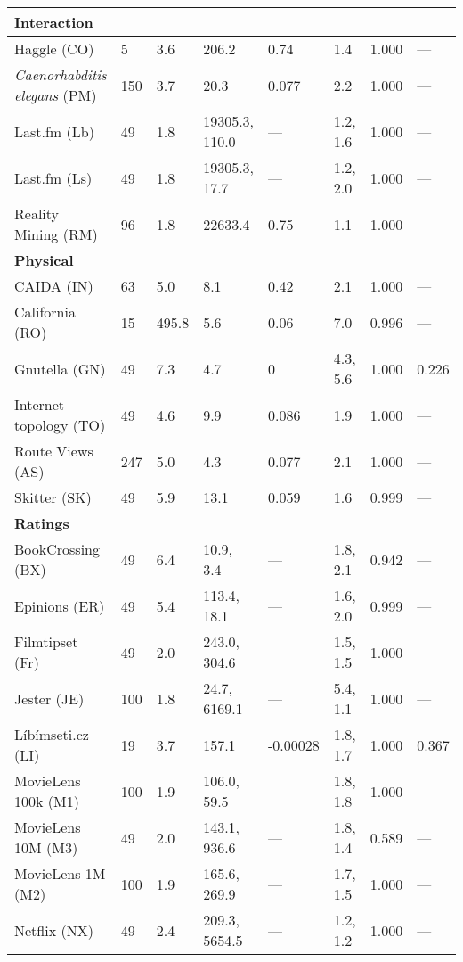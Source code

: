 \begin{longtable}{ llllllll }
\hline
\multicolumn{8}{|l|}{\textbf{Interaction}} \\
\hline
Haggle (\textsf{CO})              & 5 & 3.6 & 206.2 & 0.74 & 1.4 & 1.000 & --- \\
{\it{Caenorhabditis elegans}} (\textsf{PM}) & 150 & 3.7 & 20.3 & 0.077 & 2.2 & 1.000 & --- \\
Last.fm (\textsf{Lb})             & 49 & 1.8 & 19305.3, 110.0 & --- & 1.2, 1.6 & 1.000 & --- \\
Last.fm (\textsf{Ls})             & 49 & 1.8 & 19305.3, 17.7 & --- & 1.2, 2.0 & 1.000 & --- \\
Reality Mining (\textsf{RM})      & 96 & 1.8 & 22633.4 & 0.75 & 1.1 & 1.000 & --- \\

\hline
\multicolumn{8}{|l|}{\textbf{Physical}} \\
\hline
CAIDA (\textsf{IN})               & 63 & 5.0 & 8.1 & 0.42 & 2.1 & 1.000 & --- \\
California (\textsf{RO})          & 15 & 495.8 & 5.6 & 0.06 & 7.0 & 0.996 & --- \\
Gnutella (\textsf{GN})            & 49 & 7.3 & 4.7 & 0 & 4.3, 5.6 & 1.000 & 0.226 \\
Internet topology (\textsf{TO})   & 49 & 4.6 & 9.9 & 0.086 & 1.9 & 1.000 & --- \\
Route Views (\textsf{AS})         & 247 & 5.0 & 4.3 & 0.077 & 2.1 & 1.000 & --- \\
Skitter (\textsf{SK})             & 49 & 5.9 & 13.1 & 0.059 & 1.6 & 0.999 & --- \\

\hline
\multicolumn{8}{|l|}{\textbf{Ratings}} \\
\hline
BookCrossing (\textsf{BX})        & 49 & 6.4 & 10.9, 3.4 & --- & 1.8, 2.1 & 0.942 & --- \\
Epinions (\textsf{ER})            & 49 & 5.4 & 113.4, 18.1 & --- & 1.6, 2.0 & 0.999 & --- \\
Filmtipset (\textsf{Fr})          & 49 & 2.0 & 243.0, 304.6 & --- & 1.5, 1.5 & 1.000 & --- \\
Jester (\textsf{JE})              & 100 & 1.8 & 24.7, 6169.1 & --- & 5.4, 1.1 & 1.000 & --- \\
Líbímseti.cz (\textsf{LI})        & 19 & 3.7 & 157.1 & -0.00028 & 1.8, 1.7 & 1.000 & 0.367 \\
MovieLens 100k (\textsf{M1})      & 100 & 1.9 & 106.0, 59.5 & --- & 1.8, 1.8 & 1.000 & --- \\
MovieLens 10M (\textsf{M3})       & 49 & 2.0 & 143.1, 936.6 & --- & 1.8, 1.4 & 0.589 & --- \\
MovieLens 1M (\textsf{M2})        & 100 & 1.9 & 165.6, 269.9 & --- & 1.7, 1.5 & 1.000 & --- \\
Netflix (\textsf{NX})             & 49 & 2.4 & 209.3, 5654.5 & --- & 1.2, 1.2 & 1.000 & --- \\


\end{longtable}
